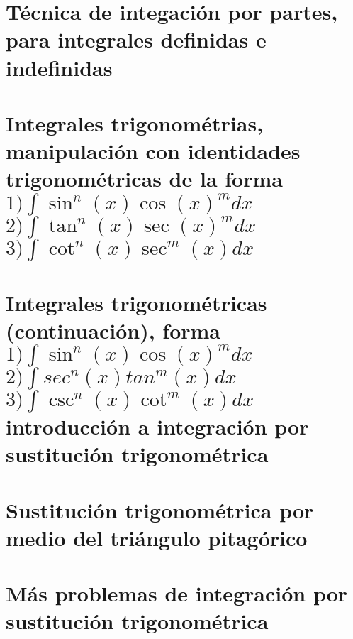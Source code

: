 \documentclass{book}
\begin{document}
\chapter{Técnica de integación por partes, para integrales definidas e indefinidas} 

\chapter{Integrales trigonométrias, manipulación con identidades trigonométricas de la forma \\ $1) \int \sin^n (x) \cos(x)^m dx$ \\ $2) \int \tan ^{n}(x) \sec (x)^{m} dx$ \\ $3) \int \cot^{n} (x)\sec^{m} (x) dx$} 

\chapter{Integrales trigonométricas (continuación), forma \\ $1) \int \sin^n (x) \cos(x)^m dx$ \\ $2) \int sec^n(x) tan^m(x) dx$ \\ $3) \int \csc^{n}(x) \cot^{m} (x)dx$ \\ introducción a integración por sustitución trigonométrica} 

\chapter{Sustitución trigonométrica por medio del triángulo pitagórico} 

\chapter{Más problemas de integración por sustitución trigonométrica} 

\end{document}
